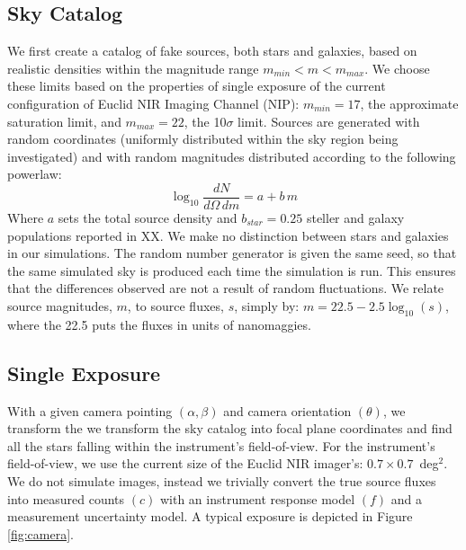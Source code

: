 \documentclass[manuscript]{aastex}
\begin{document}
\subsection{Sky Catalog}
We first create a catalog of fake sources, both stars and galaxies, based on realistic densities within the magnitude range $m_{min} < m < m_{max}$. We choose these limits based on the properties of single exposure of the current configuration of Euclid NIR Imaging Channel (NIP): $m_{min} = 17$, the approximate saturation limit, and $m_{max} = 22$, the 10$\sigma$ limit. Sources are generated with random coordinates (uniformly distributed within the sky region being investigated) and with random magnitudes distributed according to the following powerlaw:
\begin{displaymath}
\log_{10} \frac{dN}{d\Omega\,dm} = a + b\,m
\end{displaymath}
Where $a$ sets the total source density and $b_{star} = 0.25$ steller and galaxy populations reported in XX. We make no distinction between stars and galaxies in our simulations. The random number generator is given the same seed, so that the same simulated sky is produced each time the simulation is run. This ensures that the differences observed are not a result of random fluctuations. We relate source magnitudes, $m$, to source fluxes, $s$, simply by: $m = 22.5 - 2.5\log_{10}(s)$, where the 22.5 puts the fluxes in units of nanomaggies. 


\subsection{Single Exposure}
With a given camera pointing $(\alpha, \beta)$ and camera orientation $(\theta)$, we transform the we transform the sky catalog into focal plane coordinates and find all the stars falling within the instrument's field-of-view. For the instrument's field-of-view, we use the current size of the Euclid NIR imager's: $0.7 \times 0.7$~deg$^{2}$. We do not simulate images, instead we trivially convert the true source fluxes into measured counts $(c)$ with an instrument response model $(f)$ and a measurement uncertainty model. A typical exposure is depicted in Figure \ref{fig:camera}.
\end{document}
